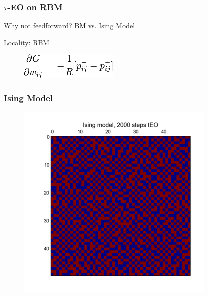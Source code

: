 \documentclass{beamer}
\begin{document}
\begin{frame}
  \frametitle{$\tau$-EO on RBM}
  Why not feedforward? BM vs. Ising Model

  Locality: RBM

  \begin{figure}
    \includegraphics{rbm_eq}
  \end{figure}
\end{frame}

\begin{frame}
  \frametitle{Ising Model}
  \begin{figure}
    \includegraphics{2000}
  \end{figure}
\end{frame}
\end{document}
